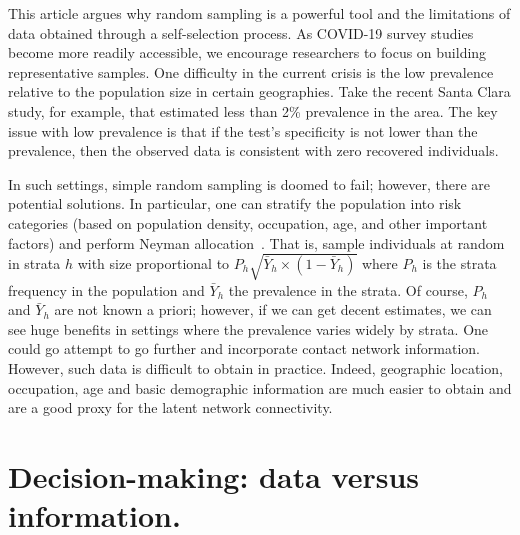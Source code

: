 \documentclass[aoas]{amsart}
\begin{document}
This article argues why random sampling is a powerful tool and the limitations of data obtained through a self-selection process.  As COVID-19 survey studies become more readily accessible, we encourage researchers to focus on building representative samples.  One difficulty in the current crisis is the low prevalence relative to the population size in certain geographies.  Take the recent Santa Clara study, for example, that estimated less than 2\% prevalence in the area.  The key issue with low prevalence is that if the test's specificity is not lower than the prevalence, then the observed data is consistent with zero recovered individuals.

In such settings, simple random sampling is doomed to fail; however, there are potential solutions.  In particular, one can stratify the population into risk categories (based on population density, occupation, age, and other important factors) and perform Neyman allocation~\citep{Cochran77}.  That is, sample individuals at random in strata $h$ with size proportional to $P_h \sqrt{\bar Y_h \times (1-\bar Y_h)}$ where $P_h$ is the strata frequency in the population and $\bar Y_h$ the prevalence in the strata. Of course, $P_h$ and $\bar Y_h$ are not known a priori; however, if we can get decent estimates, we can see huge benefits in settings where the prevalence varies widely by strata. One could go attempt to go further and incorporate contact network information.  However, such data is difficult to obtain in practice.  Indeed, geographic location, occupation, age and basic demographic information are much easier to obtain and are a good proxy for the latent network connectivity.

\section{Decision-making: data versus information.}
\end{document}

